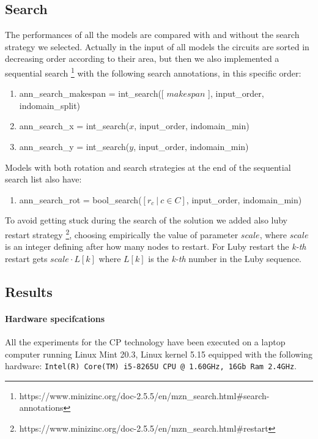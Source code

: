 
\subsection{Search} \label{sec:CP_search}
The performances of all the models are compared with and without the search strategy we selected.
Actually in the input of all models the circuits are sorted in decreasing order according to their area,
but then we also implemented a sequential search
\footnote[2]{https://www.minizinc.org/doc-2.5.5/en/mzn\_search.html\#search-annotations}
with the following search annotations, in this specific order:
\begin{enumerate}
  \item ann\_search\_makespan = int\_search([ $makespan$ ], input\_order, indomain\_split)
  \item ann\_search\_x = int\_search($x$, input\_order, indomain\_min)
  \item ann\_search\_y = int\_search($y$, input\_order, indomain\_min)
\end{enumerate}

Models with both rotation and search strategies at the end of the sequential search
list also have:
\begin{enumerate}[resume]
  \item ann\_search\_rot = bool\_search($[r_c\ |\ c \in C]$, input\_order, indomain\_min)
\end{enumerate}

To avoid getting stuck during the search of the solution we added also luby restart strategy
\footnote[3]{https://www.minizinc.org/doc-2.5.5/en/mzn\_search.html\#restart},
choosing empirically the value of parameter $scale$, where \(scale\) is an integer defining 
after how many nodes to restart. For Luby restart the \textit{k-th} restart gets 
\(scale \cdot L[k]\) where \(L[k]\) is the \textit{k-th} number in the Luby sequence.


\subsection{Results} \label{sec:CP_results}

\paragraph{Hardware specifcations}
All the experiments for the CP technology have been executed on a laptop computer running Linux Mint 20.3, Linux kernel 5.15
equipped with the following hardware:
\texttt{Intel(R) Core(TM) i5-8265U CPU @ 1.60GHz, 16Gb Ram 2.4GHz}.\\

